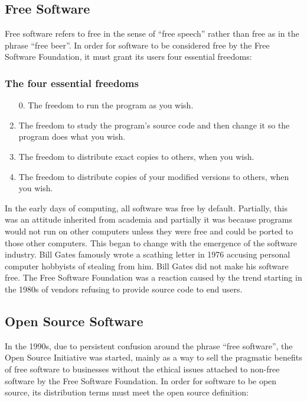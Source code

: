 \documentclass[12pt,letterpaper]{article}
\begin{document}
\subsection{Free Software}

Free software refers to free in the sense of ``free speech'' rather than free as in the phrase ``free beer''. In order for software to be considered free by the Free Software Foundation, it must grant its users four essential freedoms:\cite{fourfreedoms}

\subsubsection*{The four essential freedoms}
\begin{enumerate}
\item[0.] The freedom to run the program as you wish.
\item The freedom to study the program's source code and then change it so the program does what you wish.
\item The freedom to distribute exact copies to others, when you wish.
\item The freedom to distribute copies of your modified versions to others, when you wish.
\end{enumerate}

 In the early days of computing, all software was free by default. Partially, this was an attitude inherited from academia and partially it was because programs would not run on other computers unless they were free and could be ported to those other computers. This began to change with the emergence of the software industry.\cite{fsfhistory} Bill Gates famously wrote a scathing letter in  1976 accusing personal computer hobbyists of stealing from him. Bill Gates did not make his software free.\cite{billyg} The Free Software Foundation was a reaction caused by the trend starting in the 1980s of vendors refusing to provide source code to end users.\cite{fsfhistory}

\subsection{Open Source Software}

In the 1990s, due to persistent confusion around the phrase ``free software'', the Open Source Initiative was started, mainly as a way to sell the pragmatic benefits of free software to businesses without the ethical issues attached to non-free software by the Free Software Foundation.\cite{opensourcehistory} In order for software to be open source, its distribution terms must meet the open source definition:
\end{document}

